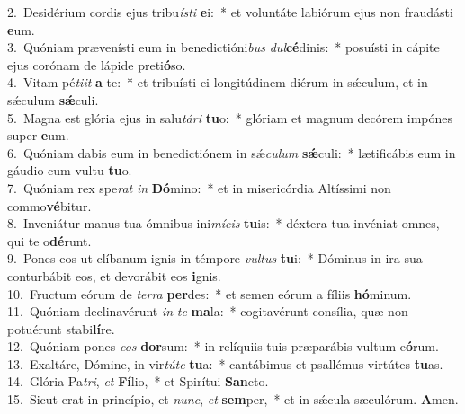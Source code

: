 {2.~}Desidérium cordis ejus tribu\textit{í}\textit{sti} \textbf{e}i:~* et voluntáte labiórum ejus non fraudásti \textbf{e}um.\\
{3.~}Quóniam prævenísti eum in benedictióni\textit{bus} \textit{dul}\textbf{cé}dinis:~* posuísti in cápite ejus corónam de lápide preti\textbf{ó}so.\\
{4.~}Vitam pé\textit{ti}\textit{it} \textbf{a} te:~* et tribuísti ei longitúdinem diérum in sǽculum, et in sǽculum \textbf{sǽ}culi.\\
{5.~}Magna est glória ejus in salu\textit{tá}\textit{ri} \textbf{tu}o:~* glóriam et magnum decórem impónes super \textbf{e}um.\\
{6.~}Quóniam dabis eum in benedictiónem in sǽ\textit{cu}\textit{lum} \textbf{sǽ}culi:~* lætificábis eum in gáudio cum vultu \textbf{tu}o.\\
{7.~}Quóniam rex spe\textit{rat} \textit{in} \textbf{Dó}mino:~* et in misericórdia Altíssimi non commo\textbf{vé}bitur.\\
{8.~}Inveniátur manus tua ómnibus ini\textit{mí}\textit{cis} \textbf{tu}is:~* déxtera tua invéniat omnes, qui te o\textbf{dé}runt.\\
{9.~}Pones eos ut clíbanum ignis in témpore \textit{vul}\textit{tus} \textbf{tu}i:~* Dóminus in ira sua conturbábit eos, et devorábit eos \textbf{i}gnis.\\
{10.~}Fructum eórum de \textit{ter}\textit{ra} \textbf{per}des:~* et semen eórum a fíliis \textbf{hó}minum.\\
{11.~}Quóniam declinavérunt \textit{in} \textit{te} \textbf{ma}la:~* cogitavérunt consília, quæ non potuérunt stabi\textbf{lí}re.\\
{12.~}Quóniam pones \textit{e}\textit{os} \textbf{dor}sum:~* in relíquiis tuis præparábis vultum e\textbf{ó}rum.\\
{13.~}Exaltáre, Dómine, in vir\textit{tú}\textit{te} \textbf{tu}a:~* cantábimus et psallémus virtútes \textbf{tu}as.\\
{14.~}Glória Pa\textit{tri}, \textit{et} \textbf{Fí}lio,~* et Spirítui \textbf{San}cto.\\
{15.~}Sicut erat in princípio, et \textit{nunc}, \textit{et} \textbf{sem}per,~* et in sǽcula sæculórum. \textbf{A}men.\\
